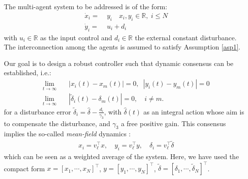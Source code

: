 \documentclass[journal,twoside]{IEEEtran}
\def\rea{\mathbb{R}}
\def\rea{\mathbb{R}}
\begin{document}
  The multi-agent system to be addressed is of the form:
  \begin{align}
  \label{sys2}
  \dot  x_i =& \; y_i \quad x_i, y_i\in \rea,\;  i \leq N \nonumber \\
  \dot y_i=& \; u_i +d_i 
  \end{align}
  with $u_i \in \rea$ as the input control and $d_i \in \rea$ the external constant disturbance.
  The interconnection among the agents is assumed to satisfy Assumption \ref{asp1}.
  
  Our goal is to design a robust controller such that dynamic consensus can be established, i.e.: 
 \begin{align}
 \label{goal1}
\lim_{t\to \infty} &\quad |x_{i}(t)-x_{m}(t) |=0, \;\; |y_{i}(t)-y_{m}(t) |  =0 \nonumber \\
\lim_{t\to \infty} &\quad |\tilde \delta_{i}(t)-\delta_m(t) |=0 , \quad i \not=m.
\end{align}
for a disturbance error $\tilde \delta_i= \hat \delta -\frac{d_i}{\gamma_3}$, with $\hat \delta (t)$ as an integral action whose aim is to compensate the disturbance, and $\gamma_3$ a free positive gain.  
This consensus implies the so-called {\it mean-field} dynamics \cite{PANLOR17}:
 \begin{align}
 \label{mf}
 x_{i}= v_\ell^\top x, \quad y_{i}= v_\ell^\top y, \quad \delta_i=v_\ell^\top \tilde \delta
 \end{align}
  which can be seen as a weighted average of the system.   
 Here, we have used the compact form $x= [x_1, \cdots, x_N]^\top$,  $y= [y_1, \cdots, y_N]^\top$, $ \tilde \delta = [\delta_1, \cdots, \tilde \delta_N]^\top$.  
\end{document}
